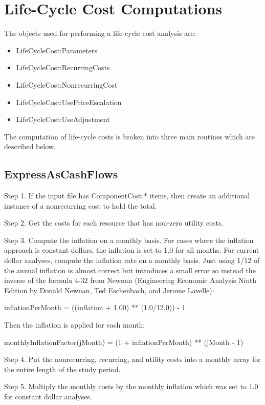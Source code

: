 \section{Life-Cycle Cost Computations}\label{life-cycle-cost-computations}

The objects used for performing a life-cycle cost analysis are:

\begin{itemize}
\item
  LifeCycleCost:Parameters
\item
  LifeCycleCost:RecurringCosts
\item
  LifeCycleCost:NonrecurringCost
\item
  LifeCycleCost:UsePriceEscalation
\item
  LifeCycleCost:UseAdjustment
\end{itemize}

The computation of life-cycle costs is broken into three main routines which are described below.

\subsection{ExpressAsCashFlows}\label{expressascashflows}

Step 1. If the input file has ComponentCost:* items, then create an additional instance of a nonrecurring cost to hold the total.

Step 2. Get the costs for each resource that has non-zero utility costs.

Step 3. Compute the inflation on a monthly basis. For cases where the inflation approach is constant dollars, the inflation is set to 1.0 for all months. For current dollar analyses, compute the inflation rate on a monthly basis. Just using 1/12 of the annual inflation is almost correct but introduces a small error so instead the inverse of the formula 4-32 from Newnan (Engineering Economic Analysis Ninth Edition by Donald Newnan, Ted Eschenbach, and Jerome Lavelle):

inflationPerMonth = ((inflation + 1.00) ** (1.0/12.0)) - 1

Then the inflation is applied for each month:

monthlyInflationFactor(jMonth) = (1 + inflationPerMonth) ** (jMonth - 1)

Step 4. Put the nonrecurring, recurring, and utility costs into a monthly array for the entire length of the study period.

Step 5. Multiply the monthly costs by the monthly inflation which was set to 1.0 for constant dollar analyses.

